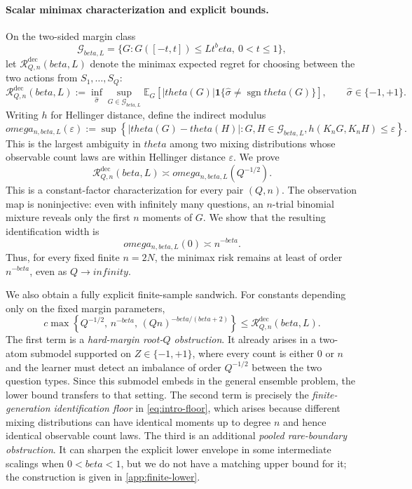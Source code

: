 \documentclass[11pt]{article}
\def\beta{beta}%
\def\theta{theta}%
\def\omega{omega}%
\def\infty{infinity}%
\newcommand{\E}{\mathbb E}
\newcommand{\one}{\mathbf 1}
\newcommand{\sgn}{\operatorname{sgn}}
\newcommand{\calG}{\mathcal G}
\newcommand{\calR}{\mathcal R}
\newcommand{\eps}{\varepsilon}
\begin{document}
\paragraph{Scalar minimax characterization and explicit bounds.}
On the two-sided margin class
\[
\calG_{\beta,L}
=
\{G:G([-t,t])\le Lt^\beta,\ 0<t\le1\},
\]
let $\calR^{\mathrm{dec}}_{Q,n}(\beta,L)$ denote the minimax expected regret for choosing between the two actions from $S_1,\ldots,S_Q$:
\[
\calR^{\mathrm{dec}}_{Q,n}(\beta,L)
:=
\inf_{\widehat\sigma}
\sup_{G\in\calG_{\beta,L}}
\E_G\!\left[
|\theta(G)|
\one\{\widehat\sigma\ne\sgn\theta(G)\}
\right],
\qquad \widehat\sigma\in\{-1,+1\}.
\]
Writing $h$ for Hellinger distance, define the indirect modulus
\[
\omega_{n,\beta,L}(\eps)
:=
\sup\left\{
|\theta(G)-\theta(H)|:
G,H\in\calG_{\beta,L},
h(K_nG,K_nH)\le\eps
\right\}.
\]
This is the largest ambiguity in $\theta$ among two mixing distributions whose observable count laws are within Hellinger distance $\eps$.  We prove %
\begin{equation}
\label{eq:intro-modulus}
\calR^{\mathrm{dec}}_{Q,n}(\beta,L)
\asymp
\omega_{n,\beta,L}(Q^{-1/2}).
\end{equation}
This is a constant-factor characterization for every pair $(Q,n)$.  The observation map is noninjective: even with infinitely many questions, an $n$-trial binomial mixture reveals only the first $n$ moments of $G$.  We show that the resulting identification width is
\begin{equation}
\label{eq:intro-floor}
\omega_{n,\beta,L}(0)
\asymp
n^{-\beta}.
\end{equation}
Thus, for every fixed finite $n=2N$, the minimax risk remains at least of order $n^{-\beta}$, even as $Q\to\infty$.

We also obtain a fully explicit finite-sample sandwich.  For constants depending only on the fixed margin parameters,
\begin{equation}
\label{eq:intro-explicit-lower}
c\max\left\{
Q^{-1/2},\,
n^{-\beta},\,
(Qn)^{-\beta/(\beta+2)}
\right\}
\le
\calR^{\mathrm{dec}}_{Q,n}(\beta,L).
\end{equation}
The first term is a \emph{hard-margin root-$Q$ obstruction}.  It already arises in a two-atom submodel supported on $Z\in\{-1,+1\}$, where every count is either $0$ or $n$ and the learner must detect an imbalance of order $Q^{-1/2}$ between the two question types.  Since this submodel embeds in the general ensemble problem, the lower bound transfers to that setting.  The second term is precisely the \emph{finite-generation identification floor} in \eqref{eq:intro-floor}, which arises because different mixing distributions can have identical moments up to degree $n$ and hence identical observable count laws.  The third is an additional \emph{pooled rare-boundary obstruction}.  It can sharpen the explicit lower envelope in some intermediate scalings when $0<\beta<1$, but we do not have a matching upper bound for it; the construction is given in \cref{app:finite-lower}.
\end{document}
